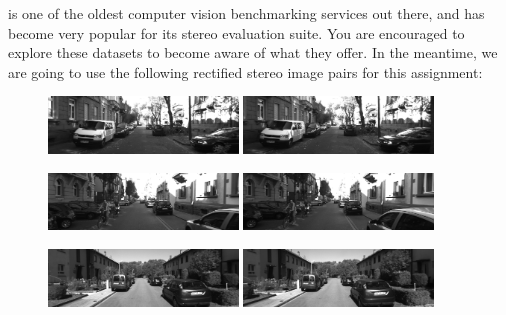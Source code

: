 \documentclass[11pt, a4paper]{article}
\begin{document}

is one of the oldest computer vision benchmarking services out there, and has become
very popular for its stereo evaluation suite. You are encouraged to explore these datasets to become aware of what they offer. In the meantime, we are going to use the following rectified stereo 
image pairs for this assignment:
\begin{figure}[h!]
  \begin{center}
    \includegraphics[width=0.45\textwidth]{stereo_images/images0/kitti_1_left}
    \includegraphics[width=0.45\textwidth]{stereo_images/images1/kitti_1_right}
  \end{center}
\end{figure}  

\begin{figure}[h!]
  \begin{center}  
    \includegraphics[width=0.45\textwidth]{stereo_images/images0/kitti_2_left}
    \includegraphics[width=0.45\textwidth]{stereo_images/images1/kitti_2_right}
\end{center}
\end{figure}  
    
\begin{figure}[h!]
  \begin{center}     
    \includegraphics[width=0.45\textwidth]{stereo_images/images0/kitti_3_left}
    \includegraphics[width=0.45\textwidth]{stereo_images/images1/kitti_3_right}
\end{center}
\end{figure}  
\end{document}
